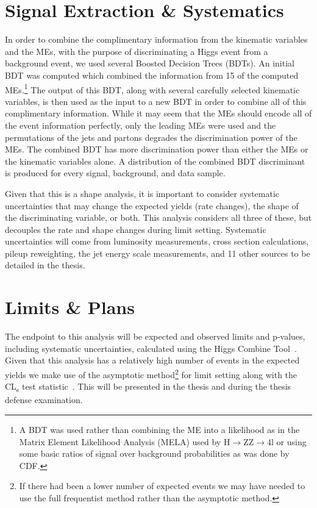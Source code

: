 \section{Signal Extraction \& Systematics}

In order to combine the complimentary information from the kinematic variables and the MEs, with the purpose of discriminating a Higgs event from a background event, we used several Boosted Decision Trees (BDTs).
An initial BDT was computed which combined the information from 15 of the computed MEs.\footnote{A BDT was used rather than combining the ME into a likelihood as in the Matrix Element Likelihood Analysis (MELA) used by H$\rightarrow$ZZ$\rightarrow$4l or using some basic ratios of signal over background probabilities as was done by CDF.}
The output of this BDT, along with several carefully selected kinematic variables, is then used as the input to a new BDT in order to combine all of this complimentary information.
While it may seem that the MEs should encode all of the event information perfectly, only the leading MEs were used and the permutations of the jets and partons degrades the discrimination power of the MEs.
The combined BDT has more discrimination power than either the MEs or the kinematic variables alone.
A distribution of the combined BDT discriminant is produced for every signal, background, and data sample.

Given that this is a shape analysis, it is important to consider systematic uncertainties that may change the expected yields (rate changes), the shape of the discriminating variable, or both.
This analysis considers all three of these, but decouples the rate and shape changes during limit setting.
Systematic uncertainties will come from luminosity measurements, cross section calculations, pileup reweighting, the jet energy scale measurements, and 11 other sources to be detailed in the thesis.

\section{Limits \& Plans}

The endpoint to this analysis will be expected and observed limits and p-values, including systematic uncertainties, calculated using the Higgs Combine Tool~\cite{CombineToolTwiki}.
Given that this analysis has a relatively high number of events in the expected yields we make use of the asymptotic method\footnote{If there had been a lower number of expected events we may have needed to use the full frequentist method rather than the asymptotic method.} for limit setting along with the CL\textsubscript{s} test statistic~\cite{Read:2002hq}.
This will be presented in the thesis and during the thesis defense examination.
